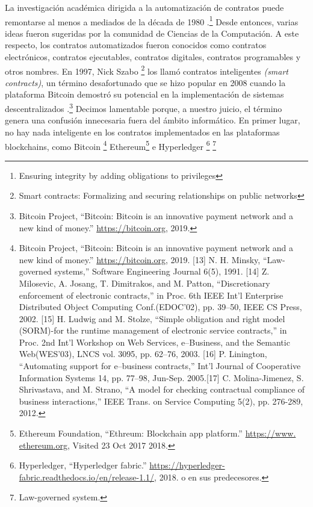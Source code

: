 \documentclass[12pt]{report} %
\begin{document}
La investigación académica dirigida a la automatización de contratos puede remontarse al menos a mediados de la década de 1980 .\footnote{\cite{Minsky1985}Ensuring integrity by adding obligations to privileges} Desde entonces, varias ideas fueron sugeridas por la comunidad de Ciencias de la Computación. A este respecto, los contratos automatizados fueron conocidos como contratos electrónicos, contratos ejecutables, contratos digitales, contratos programables y otros nombres. 
En 1997, Nick Szabo \footnote{\cite{Szabo1997} Smart contracts: Formalizing and securing relationships on public networks} los llamó contratos inteligentes \textit{(smart contracts)}, un término desafortunado que se hizo popular en 2008 cuando la plataforma Bitcoin demostró su potencial en la implementación de sistemas descentralizados .\footnote{Bitcoin Project, “Bitcoin: Bitcoin is an innovative payment network and a new kind of money.” \url{https://bitcoin.org}, 2019.} Decimos lamentable porque, a nuestro juicio, el término genera una confusión innecesaria fuera del ámbito informático. En primer lugar, no hay nada inteligente en los contratos implementados en las plataformas blockchains, como Bitcoin \footnote{Bitcoin Project, “Bitcoin: Bitcoin is an innovative payment network and a new kind of money.” \url{https://bitcoin.org}, 2019.  [13] N. H. Minsky, “Law-governed systems,” Software Engineering Journal 6(5), 1991. [14] Z. Milosevic, A. Josang, T. Dimitrakos, and M. Patton, “Discretionary enforcement of electronic contracts,” in Proc. 6th IEEE Int’l Enterprise Distributed Object Computing Conf.(EDOC’02), pp. 39–50, IEEE CS Press, 2002. [15] H. Ludwig and M. Stolze, “Simple obligation and right model (SORM)-for the runtime management of electronic service contracts,” in Proc. 2nd Int’l Workshop on Web Services, e–Business, and the Semantic Web(WES’03), 
LNCS vol. 3095, pp. 62–76, 2003. [16] P. Linington, “Automating support for e–business contracts,” Int’l Journal of Cooperative Information Systems 14, pp. 77–98, Jun-Sep. 2005.[17] C. Molina-Jimenez, S. Shrivastava, and M. Strano, “A model for checking contractual compliance of business interactions,” IEEE Trans. on Service Computing 5(2), pp. 276-289, 2012.} Ethereum\footnote{Ethereum Foundation, “Ethreum: Blockchain app platform.” \url{https://www. ethereum.org}, Visited 23 Oct 2017 2018.}  e Hyperledger \footnote{Hyperledger, “Hyperledger fabric.” \url{https://hyperledger-fabric.readthedocs.io/en/release-1.1/}, 2018.  o en sus predecesores.} \footnote{\cite{Minsky1991}Law-governed system.}
\end{document}
